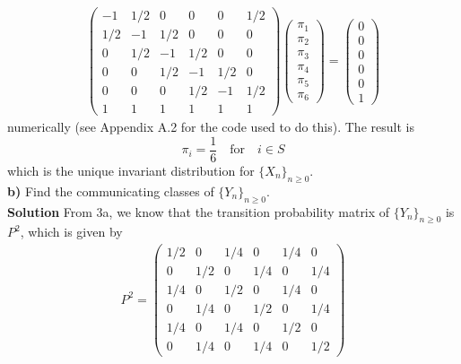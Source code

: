 \documentclass[11pt, letterpaper]{article}
\begin{document}
    \begin{align*}
        \begin{pmatrix}
            -1 & 1/2 & 0 & 0 & 0 & 1/2\\
            1/2 & -1 & 1/2 & 0 & 0 & 0\\
            0 & 1/2 & -1 & 1/2 & 0 & 0\\
            0 & 0 & 1/2 & -1 & 1/2 & 0\\
            0 & 0 & 0 & 1/2 & -1 & 1/2\\
            1 & 1 & 1 & 1 & 1 & 1 
        \end{pmatrix}\begin{pmatrix}
            \pi_1\\
            \pi_2\\
            \pi_3\\
            \pi_4\\
            \pi_5\\
            \pi_6
        \end{pmatrix}=\begin{pmatrix}
            0\\
            0\\
            0\\
            0\\
            0\\
            1
        \end{pmatrix}
    \end{align*}
    numerically (see Appendix A.2 for the code used to do this). The result is
    \[\pi_i=\frac{1}{6}\quad\text{for}\quad i\in S\]
    which is the unique invariant distribution for $\{X_n\}_{n\geq 0}$.\\[10pt]
    {\bf b)} Find the communicating classes of $\{Y_n\}_{n\geq 0}$.\\[10pt]
    {\bf Solution} From 3a, we know that the transition probability matrix of $\{Y_n\}_{n\geq 0}$ is $P^2$, which is given by
    \begin{align*}
        P^2=\begin{pmatrix}
            1/2 & 0 & 1/4 & 0 & 1/4 & 0\\
            0 & 1/2 & 0 & 1/4 & 0 & 1/4\\
            1/4 & 0 & 1/2 & 0 & 1/4 & 0\\
            0 & 1/4 & 0 & 1/2 & 0 & 1/4\\
            1/4 & 0 & 1/4 & 0 & 1/2 & 0\\
            0 & 1/4 & 0 & 1/4 & 0 & 1/2
        \end{pmatrix}
    \end{align*}  
\end{document}
